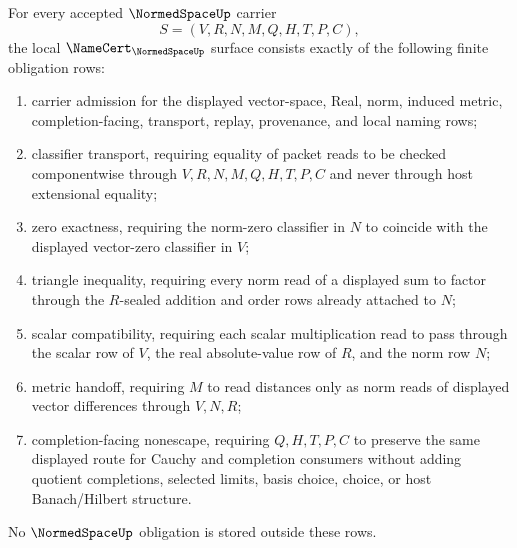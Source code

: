 \begin{theorem}
\label{thm:normed-space-namecert-obligations}
For every accepted $\NormedSpaceUp$ carrier
$$
S=(V,R,N,M,Q,H,T,P,C),
$$
the local $\NameCert_{\NormedSpaceUp}$ surface consists exactly of the following finite obligation rows:
\begin{enumerate}
\item carrier admission for the displayed vector-space, Real, norm, induced metric, completion-facing, transport, replay, provenance, and local naming rows;
\item classifier transport, requiring equality of packet reads to be checked componentwise through $V,R,N,M,Q,H,T,P,C$ and never through host extensional equality;
\item zero exactness, requiring the norm-zero classifier in $N$ to coincide with the displayed vector-zero classifier in $V$;
\item triangle inequality, requiring every norm read of a displayed sum to factor through the $R$-sealed addition and order rows already attached to $N$;
\item scalar compatibility, requiring each scalar multiplication read to pass through the scalar row of $V$, the real absolute-value row of $R$, and the norm row $N$;
\item metric handoff, requiring $M$ to read distances only as norm reads of displayed vector differences through $V,N,R$;
\item completion-facing nonescape, requiring $Q,H,T,P,C$ to preserve the same displayed route for Cauchy and completion consumers without adding quotient completions, selected limits, basis choice, choice, or host Banach/Hilbert structure.
\end{enumerate}
No $\NormedSpaceUp$ obligation is stored outside these rows.
\end{theorem}
